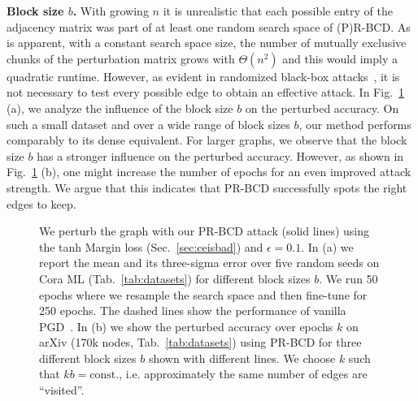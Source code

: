 \documentclass[sigconf, review]{acmart}
\begin{document}
\textbf{Block size \(b\).} With growing \(n\) it is unrealistic that each possible entry of the adjacency matrix was part of at least one random search space of (P)R-BCD. As is apparent, with a constant search space size, the number of mutually exclusive chunks of the perturbation matrix grows with \(\Theta(n^2)\) and this would imply a quadratic runtime. However, as evident in randomized black-box attacks~\citep{Waniek2018}, it is not necessary to test every possible edge to obtain an effective attack. In Fig.~\ref{fig:randomblocksizeinfluence} (a), we analyze the influence of the block size \(b\) on the perturbed accuracy. On such a small dataset and over a wide range of block sizes \(b\), our method performs comparably to its dense equivalent. For larger graphs, we observe that the block size \(b\) has a stronger influence on the perturbed accuracy. However, as shown in Fig.~\ref{fig:randomblocksizeinfluence} (b), one might increase the number of epochs for an even improved attack strength. We argue that this indicates that PR-BCD successfully spots the right edges to keep.

\begin{figure}[t]
  \centering
  \resizebox{\linewidth}{!}{}
  \caption{
  We perturb the graph with our PR-BCD attack (solid lines) 
  using the tanh Margin loss (Sec.~\ref{sec:ceisbad}) and \(\epsilon=0.1\).
  In (a) we report the mean and its three-sigma error over five random seeds on Cora ML (Tab.~\ref{tab:datasets}) for different block sizes $b$. We run 50 epochs where we resample the search space and then fine-tune for 250 epochs. The dashed lines show the performance of vanilla PGD~\citep{Xu2019a}. In (b) we show the perturbed accuracy over epochs \(k\) on arXiv (170k nodes, Tab.~\ref{tab:datasets})
  using PR-BCD for three different block sizes \(b\) shown with different lines. We choose \(k\) such that \(k b = \text{const.}\), i.e. approximately the same number of edges are ``visited''. \label{fig:randomblocksizeinfluence}}
\end{figure}
\end{document}
